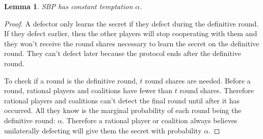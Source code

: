 \documentclass[12pt]{dalcsthesis}
\newtheorem{lemma}{Lemma}
\begin{document}
\begin{lemma}\label{Lem:SBPConstTempt}SBP has constant temptation $\alpha$.\end{lemma}
\begin{proof}
A defector only learns the secret if they defect during the definitive round. If they defect earlier, then the other players will stop cooperating with them and they won't receive the round shares necessary to learn the secret on the definitive round. They can't defect later because the protocol ends after the definitive round. 

To check if a round is the definitive round, $t$ round shares are needed. Before a round, rational players and coalitions have fewer than $t$ round shares. Therefore rational players and coalitions can't detect the final round until after it has occurred. All they know is the marginal probability of each round being the definitive round: $\alpha$. Therefore a rational player or coalition always believes unilaterally defecting will give them the secret with probability $\alpha$.
\end{proof}
\end{document}
